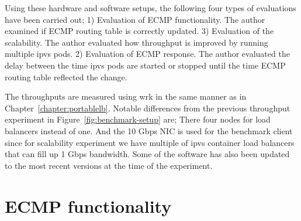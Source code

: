 Using these hardware and software setups, the following four types of evaluations have been carried out;
1) Evaluation of ECMP functionality. The author examined if ECMP routing table is correctly updated.
3) Evaluation of the scalability. The author evaluated how throughput is improved by running multiple ipvs pods.
2) Evaluation of ECMP response. The author evaluated the delay between the time ipvs pods are started or stopped until the time ECMP routing table reflected the change.

The throughputs are measured using wrk in the same manner as in Chapter~\ref{chapter:portablelb}.
Notable differences from the previous throughput experiment in Figure~\ref{fig:benchmark-setup} are;
There four nodes for load balancers instead of one.
And the 10 Gbps NIC is used for the benchmark client since for scalability experiment we have multiple of ipvs container load balancers that can fill up 1 Gbps bandwidth.
Some of the software has also been updated to the most recent versions at the time of the experiment.

\FloatBarrier

\section{ECMP functionality}

